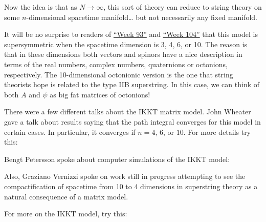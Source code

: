 \documentclass{article}
\def\tightlist{}
\renewcommand{\texttt}[1]{%
  \begingroup
  \ttfamily
  \begingroup\lccode`~=`/\lowercase{\endgroup\def~}{/\discretionary{}{}{}}%
  \begingroup\lccode`~=`[\lowercase{\endgroup\def~}{[\discretionary{}{}{}}%
  \begingroup\lccode`~=`.\lowercase{\endgroup\def~}{.\discretionary{}{}{}}%
  \catcode`/=\active\catcode`[=\active\catcode`.=\active
  \scantokens{#1\noexpand}%
  \endgroup
}
\begin{document}
Now the idea is that as \(N \to \infty\), this sort of theory can reduce
to string theory on some \(n\)-dimensional spacetime manifold\ldots{}
but not necessarily any fixed manifold.

It will be no surprise to readers of \protect\hyperlink{week93}{``Week
93''} and \protect\hyperlink{week104}{``Week 104''} that this model is
supersymmetric when the spacetime dimension is 3, 4, 6, or 10. The
reason is that in these dimensions both vectors and spinors have a nice
description in terms of the real numbers, complex numbers, quaternions
or octonions, respectively. The 10-dimensional octonionic version is the
one that string theorists hope is related to the type IIB superstring.
In this case, we can think of both \(A\) and \(\psi\) as big fat
matrices of octonions!

There were a few different talks about the IKKT matrix model. John
Wheater gave a talk about results saying that the path integral
converges for this model in certain cases. In particular, it converges
if \(n = 4\), \(6\), or \(10\). For more details try this:


Bengt Petersson spoke about computer simulations of the IKKT model:


Also, Graziano Vernizzi spoke on work still in progress attempting to
see the compactification of spacetime from 10 to 4 dimensions in
superstring theory as a natural consequence of a matrix model.

For more on the IKKT model, try this:

\end{document}
